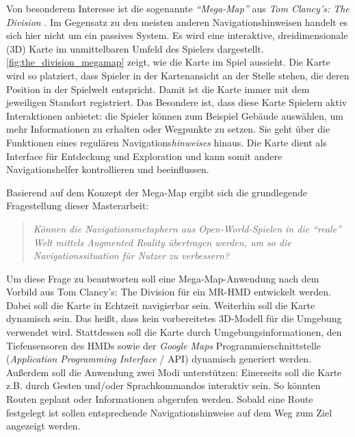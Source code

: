 \documentclass[a4paper]{scrartcl}
\begin{document}
Von besonderem Interesse ist die sogenannte \emph{\enquote{Mega-Map}} aus \emph{Tom Clancy's: The Division} \autocite{bibid}.
Im Gegensatz zu den meisten anderen Navigationshinweisen handelt es sich hier nicht um ein passives System.
Es wird eine interaktive, dreidimensionale (3D) Karte im unmittelbaren Umfeld des Spielers dargestellt.
\autoref{fig:the_division_megamap} zeigt, wie die Karte im Spiel aussieht.
Die Karte wird so platziert, dass Spieler in der Kartenansicht an der Stelle stehen, die deren Position in der Spielwelt entspricht.
Damit ist die Karte immer mit dem jeweiligen Standort registriert.
Das Besondere ist, dass diese Karte Spielern aktiv Interaktionen anbietet:
die Spieler können zum Beispiel Gebäude auswählen, um mehr Informationen zu erhalten oder Wegpunkte zu setzen.
Sie geht über die Funktionen eines regulären Navigations\emph{hinweises} hinaus.
Die Karte dient als Interface für Entdeckung und Exploration und kann somit andere Navigationshelfer kontrollieren und beeinflussen.

Basierend auf dem Konzept der Mega-Map ergibt sich die grundlegende Fragestellung dieser Masterarbeit:
\begin{quote}
	\itshape
	Können die Navigationsmetaphern aus Open-World-Spielen in die \enquote{reale} Welt mittels Augmented Reality übertragen werden, um so die Navigationssituation für Nutzer zu verbessern?
\end{quote}

Um diese Frage zu beantworten soll eine Mega-Map-Anwendung nach dem Vorbild aus Tom Clancy's: The Division für ein MR-HMD entwickelt werden.
Dabei soll die Karte in Echtzeit navigierbar sein.
Weiterhin soll die Karte dynamisch sein.
Das heißt, dass kein vorbereitetes 3D-Modell für die Umgebung verwendet wird.
Stattdessen soll die Karte durch Umgebungsinformationen, den Tiefensensoren des HMDs sowie der \emph{Google Maps} Programmierschnittstelle (\emph{Application Programming Interface} / API) dynamisch generiert werden.
Außerdem soll die Anwendung zwei Modi unterstützen: Einerseits soll die Karte z.B. durch Gesten und/oder Sprachkommandos interaktiv sein.
So könnten Routen geplant oder Informationen abgerufen werden.
Sobald eine Route festgelegt ist sollen entsprechende Navigationshinweise auf dem Weg zum Ziel angezeigt werden.
\end{document}
